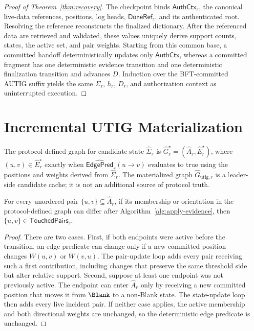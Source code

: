\begin{proof}[Proof of Theorem~\ref{thm:recovery}]
The checkpoint binds $\mathsf{AuthCtx}_r$, the canonical live-data references,
positions, log heads, $\mathsf{DoneRef}_r$, and its authenticated root.  Resolving the
reference reconstructs the finalized dictionary.  After the referenced data
are retrieved and validated, these values uniquely derive support counts, states,
the active set, and pair weights.  Starting from this common base, a committed
handoff deterministically updates only $\mathsf{AuthCtx}$, whereas a committed
fragment has one deterministic evidence transition and one deterministic
finalization transition and advances $D$.  Induction over the BFT-committed
AUTIG suffix yields the same $\Sigma_r$, $h_r$, $D_r$, and authorization context
as uninterrupted execution.
\end{proof}

\section{Incremental UTIG Materialization}
\label{app:incremental-materialization}

The protocol-defined graph for candidate state $\widehat\Sigma_r$ is
$\widehat G_r^\star=(\widehat A_r,\widehat E_r^\star)$, where
$(u,v)\in\widehat E_r^\star$ exactly when
$\widehat{\mathsf{EdgePred}}_r(u\to v)$ evaluates to true using the positions and
weights derived from $\widehat\Sigma_r$.  The materialized graph
$\widehat G_{\mathrm{utig},r}$ is a leader-side candidate cache; it is not an
additional source of protocol truth.

\begin{lemma}
\label{lem:touched-pair-completeness}
For every unordered pair $\{u,v\}\subseteq\widehat A_r$, if its membership or
orientation in the protocol-defined graph can differ after
Algorithm~\ref{alg:apply-evidence}, then
$\{u,v\}\in\mathsf{TouchedPairs}_r$.
\end{lemma}

\begin{proof}
There are two cases.  First, if both endpoints were active before the
transition, an edge predicate can change only if a new committed position
changes $W(u,v)$ or $W(v,u)$.  The pair-update loop adds every pair receiving
such a first contribution, including changes that preserve the same threshold
side but alter relative support.  Second, suppose at least one endpoint was
not previously active.  The endpoint can enter $\widehat A_r$ only by receiving
a new committed position that moves it from $\Blank$ to a non-Blank state.
The state-update loop then adds every live incident pair.  If neither case
applies, the active membership and both directional weights are unchanged, so
the deterministic edge predicate is unchanged.
\end{proof}

